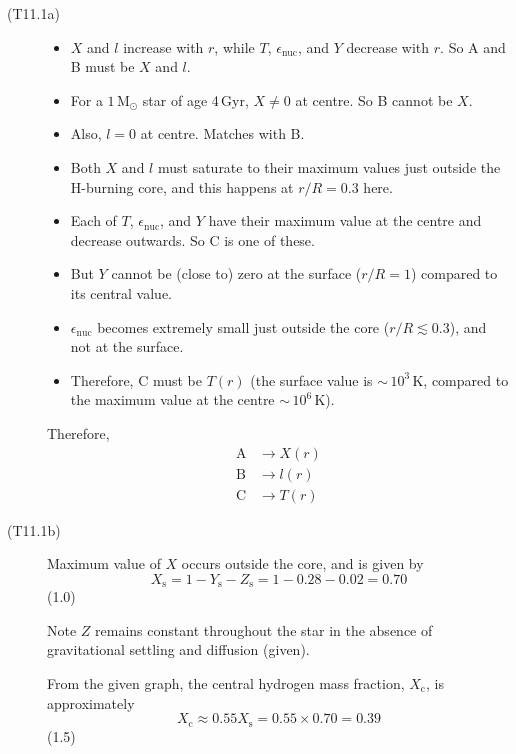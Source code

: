 \begin{description}
\item[(T11.1a)]\mbox{}
  \begin{itemize}
  \item $X$ and $l$ increase with $r$, while $T$, $\epsilon_{\mathrm{nuc}}$,
    and $Y$ decrease with $r$. So A and B must be $X$ and $l$.
  \item For a $1\,\mathrm{M_\odot}$ star of age 4\,Gyr, $X \neq 0$ at centre.
    So B cannot be $X$.
  \item Also, $l = 0$ at centre. Matches with B.
  \item Both $X$ and $l$ must saturate to their maximum values just outside
    the H-burning core, and this happens at $r/R = 0.3$ here.
  \item Each of $T$, $\epsilon_{\mathrm{nuc}}$, and $Y$ have their maximum
    value at the centre and decrease outwards. So C is one of these.
  \item But $Y$ cannot be (close to) zero at the surface ($r/R = 1$) compared
    to its central value.
  \item $\epsilon_{\mathrm{nuc}}$ becomes extremely small just outside the
    core ($r/R \lesssim 0.3$), and not at the surface.
  \item Therefore, C must be $T(r)$ (the surface value is
    ${\sim}\,10^3$\,K, compared to the maximum value at the centre
    ${\sim}\,10^6$\,K).
  \end{itemize}
  Therefore,
  \begin{align*}
    \mathrm{A} &\longrightarrow X(r) \tag*{(2.0)}\\
    \mathrm{B} &\longrightarrow l(r) \tag*{(2.0)}\\
    \mathrm{C} &\longrightarrow T(r) \tag*{(2.0)}
  \end{align*}

\item[(T11.1b)] Maximum value of $X$ occurs outside the core, and is given by
  \[
    X_{\mathrm{s}} = 1 - Y_{\mathrm{s}} - Z_{\mathrm{s}}
    = 1 - 0.28 - 0.02 = 0.70
  \]
  \hfill(1.0)

  Note $Z$ remains constant throughout the star in the absence of
  gravitational settling and diffusion (given).

  From the given graph, the central hydrogen mass fraction, $X_{\mathrm{c}}$,
  is approximately
  \[
    X_{\mathrm{c}} \approx 0.55 X_{\mathrm{s}} = 0.55 \times 0.70 = 0.39
  \]
  \hfill(1.5)


\end{description}
